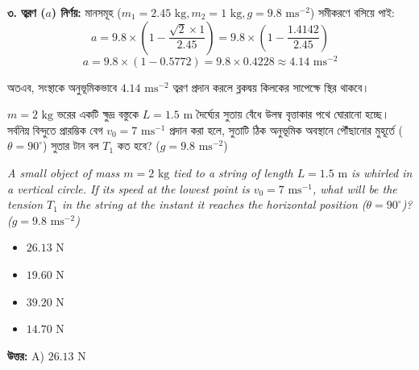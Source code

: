 \documentclass[12pt, a4paper]{article}
\begin{document}
{\begin{tcolorbox}[solutionbox={সমাধান (Solution)}]
\vspace{0.5em}
\textbf{৩. ত্বরণ ($a$) নির্ণয়:}
মানসমূহ ($m_1 = 2.45\text{ kg}, m_2 = 1\text{ kg}, g = 9.8\text{ ms}^{-2}$) সমীকরণে বসিয়ে পাই:
$$a = 9.8 \times \left(1 - \frac{\sqrt{2} \times 1}{2.45}\right) = 9.8 \times \left(1 - \frac{1.4142}{2.45}\right)$$
$$a = 9.8 \times (1 - 0.5772) = 9.8 \times 0.4228 \approx 4.14\text{ ms}^{-2}$$

অতএব, সংস্থাকে অনুভূমিকভাবে $4.14\text{ ms}^{-2}$ ত্বরণ প্রদান করলে ব্লকদ্বয় কিলকের সাপেক্ষে স্থির থাকবে।
\end{tcolorbox}
\vspace{1em}
\begin{tcolorbox}[questionbox={প্রশ্ন (Question) 35}]
\noindent
$m = 2\text{ kg}$ ভরের একটি ক্ষুদ্র বস্তুকে $L = 1.5\text{ m}$ দৈর্ঘ্যের সুতায় বেঁধে উলম্ব বৃত্তাকার পথে ঘোরানো হচ্ছে। সর্বনিম্ন বিন্দুতে প্রারম্ভিক বেগ $v_0 = 7\text{ ms}^{-1}$ প্রদান করা হলে, সুতাটি ঠিক অনুভূমিক অবস্থানে পৌঁছানোর মুহূর্তে ($\theta = 90^\circ$) সুতার টান বল $T_1$ কত হবে? ($g = 9.8\text{ ms}^{-2}$)
\vspace{0.8em}
\begin{english}
\noindent\textit{\color{darkgray}
A small object of mass $m = 2\text{ kg}$ tied to a string of length $L = 1.5\text{ m}$ is whirled in a vertical circle. If its speed at the lowest point is $v_0 = 7\text{ ms}^{-1}$, what will be the tension $T_1$ in the string at the instant it reaches the horizontal position ($\theta = 90^\circ$)? ($g = 9.8\text{ ms}^{-2}$)
}
\end{english}
\end{tcolorbox}

\begin{itemize}[label={}, leftmargin=1cm, itemsep=0.5em]
\item[\textbf{A)}] $26.13\text{ N}$
\item[\textbf{B)}] $19.60\text{ N}$
\item[\textbf{C)}] $39.20\text{ N}$
\item[\textbf{D)}] $14.70\text{ N}$
\end{itemize}
\vspace{0.5em}

\begin{tcolorbox}[answerbox]
\textbf{\color{success} উত্তর:} A) $26.13\text{ N}$
\end{tcolorbox}
\vspace{1em}

}
\end{document}
